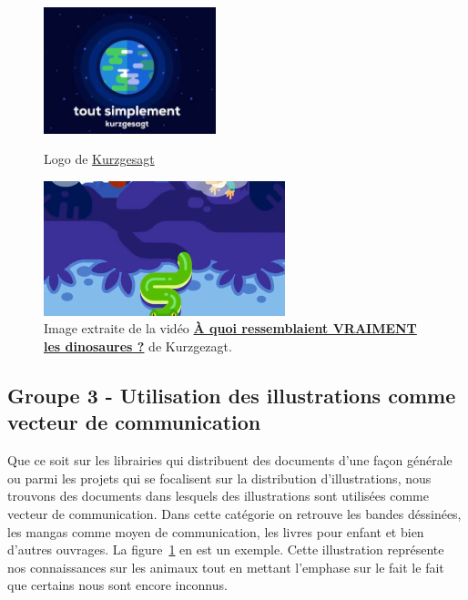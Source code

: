 	\begin{figure}[ht]
		\vspace{10pt}
		\centering
		\begin{minipage}{0.45\textwidth}
			\centering
			\includegraphics[width=5cm]{Pictures/LogoKurzgesagt.png}
			\caption{Logo de \href{https://www.kurzgesagt.org/}{Kurzgesagt}}
			\label{LogoKurzgesagt}
		\end{minipage}
		\hspace{10pt}
		\begin{minipage}{0.45\textwidth}
			\centering
			\includegraphics[width=7cm]{Pictures/AnimauxConnus.png}
			\caption{Image extraite de la vid\'eo \href{https://www.kurzgesagt.org/}{\textbf{\`A quoi ressemblaient VRAIMENT les dinosaures ?}} de Kurzgezagt.}
			\label{FigDino}
		\end{minipage}
	\end{figure}



\subsection{Groupe 3 - Utilisation des illustrations comme vecteur de communication}
Que ce soit sur les librairies qui distribuent des documents d'une fa\c{c}on g\'en\'erale ou parmi les projets qui se focalisent sur la distribution d'illustrations, nous trouvons des documents dans lesquels des illustrations sont utilis\'ees comme vecteur de communication. Dans cette cat\'egorie on retrouve les bandes d\'essin\'ees, les mangas comme moyen de communication, les livres pour enfant et bien d'autres ouvrages. La figure~\ref{FigDino} en est un exemple. Cette illustration repr\'esente nos connaissances sur les animaux tout en mettant l'emphase sur le fait le fait que certains nous sont encore inconnus.

